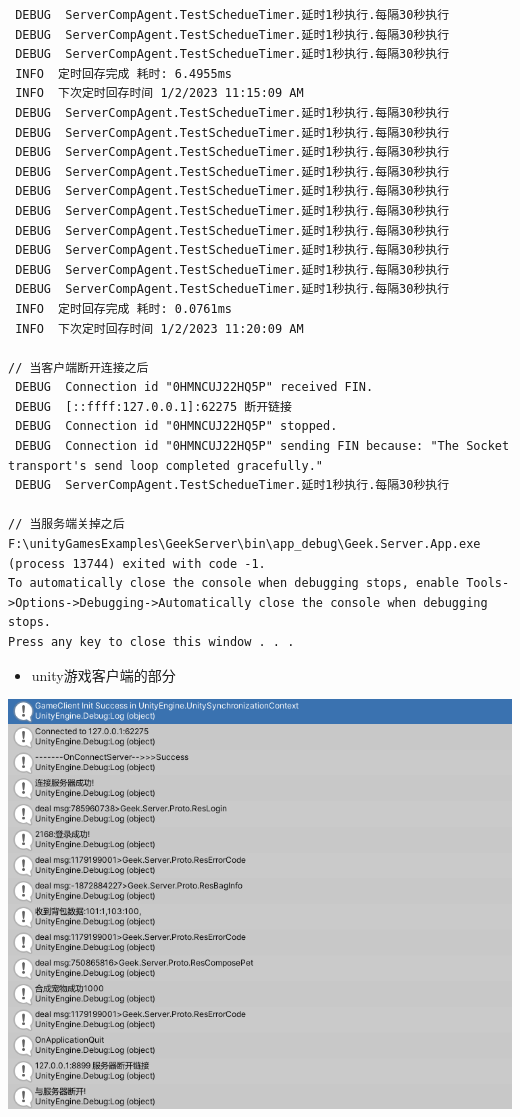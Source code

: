 \documentclass[9pt, b5paper]{article}
\begin{document}
\begin{verbatim}
 DEBUG  ServerCompAgent.TestSchedueTimer.延时1秒执行.每隔30秒执行
 DEBUG  ServerCompAgent.TestSchedueTimer.延时1秒执行.每隔30秒执行
 DEBUG  ServerCompAgent.TestSchedueTimer.延时1秒执行.每隔30秒执行
 INFO  定时回存完成 耗时: 6.4955ms
 INFO  下次定时回存时间 1/2/2023 11:15:09 AM
 DEBUG  ServerCompAgent.TestSchedueTimer.延时1秒执行.每隔30秒执行
 DEBUG  ServerCompAgent.TestSchedueTimer.延时1秒执行.每隔30秒执行
 DEBUG  ServerCompAgent.TestSchedueTimer.延时1秒执行.每隔30秒执行
 DEBUG  ServerCompAgent.TestSchedueTimer.延时1秒执行.每隔30秒执行
 DEBUG  ServerCompAgent.TestSchedueTimer.延时1秒执行.每隔30秒执行
 DEBUG  ServerCompAgent.TestSchedueTimer.延时1秒执行.每隔30秒执行
 DEBUG  ServerCompAgent.TestSchedueTimer.延时1秒执行.每隔30秒执行
 DEBUG  ServerCompAgent.TestSchedueTimer.延时1秒执行.每隔30秒执行
 DEBUG  ServerCompAgent.TestSchedueTimer.延时1秒执行.每隔30秒执行
 DEBUG  ServerCompAgent.TestSchedueTimer.延时1秒执行.每隔30秒执行
 INFO  定时回存完成 耗时: 0.0761ms
 INFO  下次定时回存时间 1/2/2023 11:20:09 AM

// 当客户端断开连接之后
 DEBUG  Connection id "0HMNCUJ22HQ5P" received FIN.
 DEBUG  [::ffff:127.0.0.1]:62275 断开链接
 DEBUG  Connection id "0HMNCUJ22HQ5P" stopped.
 DEBUG  Connection id "0HMNCUJ22HQ5P" sending FIN because: "The Socket transport's send loop completed gracefully."
 DEBUG  ServerCompAgent.TestSchedueTimer.延时1秒执行.每隔30秒执行

// 当服务端关掉之后
F:\unityGamesExamples\GeekServer\bin\app_debug\Geek.Server.App.exe (process 13744) exited with code -1.
To automatically close the console when debugging stops, enable Tools->Options->Debugging->Automatically close the console when debugging stops.
Press any key to close this window . . .　
\end{verbatim}
\begin{itemize}
\item unity游戏客户端的部分
\end{itemize}

\includegraphics[width=.9\linewidth]{./pic/readme_20230102_111227.png}
\end{document}
